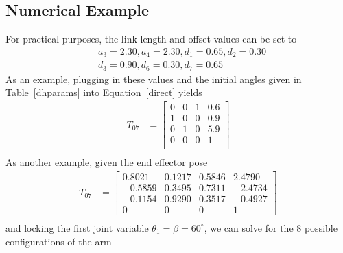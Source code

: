 \documentclass{article}
\begin{document}
\subsection{Numerical Example}
For practical purposes, the link length and offset values can be set to
\begin{align*}
&a_{3} = 2.30, a_{4} = 2.30, d_{1} = 0.65, d_{2} = 0.30 \\
&d_{3} = 0.90, d_{6} = 0.30, d_{7} = 0.65
\end{align*}
As an example, plugging in these values and the initial angles given in Table~\ref{dhparams} into Equation~\ref{direct} yields
\begin{align*}
T_{07} &=
\left[\begin{matrix}
0 & 0 & 1 & 0.6 \\
1 & 0 & 0 & 0.9 \\
0 & 1 & 0 & 5.9 \\
0 & 0 & 0 &   1 \\
\end{matrix}\right] \\
\end{align*}
As another example, given the end effector pose
\begin{align*}
T_{07} &=
\left[\begin{matrix}
0.8021 & 0.1217 & 0.5846 & 2.4790 \\
-0.5859 & 0.3495 & 0.7311 & -2.4734 \\
-0.1154 & 0.9290 & 0.3517 & -0.4927 \\
0 & 0 & 0 & 1
\end{matrix}\right] \\
\end{align*}
and locking the first joint variable $\theta_1 = \beta = 60^\circ$, we can solve for the 8 possible configurations of the arm
\end{document}
